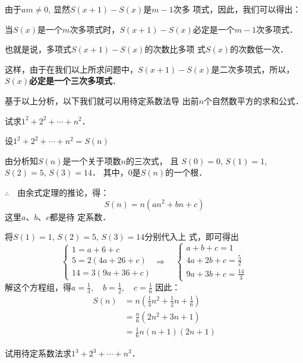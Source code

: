 由于$am\ne 0$, 显然$S(x+1)-S(x)$是$m-1$次多
项式，因此，我们可以得出：

\begin{blk}{}
    当$S(x)$是一个$m$次多项式时，$S(x+1)-S(x)$必定是一个$m-1$次多项式．
\end{blk}

也就是说，多项式$S(x+1)-S(x)$的次数比多项
式$S(x)$的次数低一次．

这样，由于在我们以上所求问题中，$S(x+1)-S(x)$是二次多项式，所以，
\textbf{$S(x)$必定是一个三次多项式}．

基于以上分析，以下我们就可以用待定系数法导
出前$n$个自然数平方的求和公式．


\begin{example}
    试求$1^2+2^2+\cdots+n^2$．
\end{example}


\begin{solution}
    设$1^2+2^2+\cdots+n^2=S(n)$

由分析知$S(n)$是一个关于项数$n$的三次式，
且 $S(0)=0$, $S(1)=1$, $S(2)=5$, $S(3)=14$．
其中，0是$S(n)$的一个根．

$\therefore\quad $由余式定理的推论，得：
\[S(n)=n(an^2+bn+c)\]
这里$a$、$b$、$c$都是待
定系数．

将$S(1)=1$, $S(2)=5$, $S(3)=14$分别代入上
式，即可得出
\[\begin{cases}
    1=a+6+c\\
5=2(4a+26+c)\\
14=3(9a+36+c)
\end{cases}\Rightarrow\quad \begin{cases}
    a+b+c=1\\
4a+2b+c=\frac{5}{2}\\
9a+3b+c=\frac{14}{3}
\end{cases}\]
解这个方程组，得$a=\frac{1}{3},\quad b=\frac{1}{2},\quad c=\frac{1}{6}$
因此：
\[\begin{split}
    S(n)&=n\left(\frac{1}{3}n^2+\frac{1}{2}n+\frac{1}{6}\right)\\
&=\frac{n}{6}(2n^2+3n+1)\\
&=\frac{1}{6}n(n+1)(2n+1)
\end{split}\]
\end{solution}


\begin{ex}
    试用待定系数法求$1^3+2^3+\cdots+n^3$．
\end{ex}



